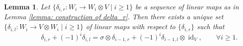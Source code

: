 \documentclass[a4paper,10pt]{amsart}
\newtheorem{lemma}[theorem]{Lemma}
\theoremstyle{definition}
\numberwithin{equation}{section}
\DeclareMathOperator{\Image}{Im} \DeclareMathOperator{\Ext}{Ext}
\DeclareMathOperator{\id}{id}
\begin{document}
\begin{lemma}\label{lemma: construction of delta_l}
Let $\{\delta_{i,r}:W_i\to W_i\otimes V\mid i\geq 1\}$ be a sequence of linear maps as in Lemma \ref{lemma: construction of delta_r}. Then there exists a unique set $\{\delta_{i,l}:W_i\to V\otimes W_i\mid i\geq 1\}$ of linear  maps with respect to $\{\delta_{i,r}\}$ such that
\begin{equation}\label{eq: relation between delta_l and delta_r}\qquad\quad
\delta_{i,r}+(-1)^i\delta_{i,l}=\sigma\otimes\delta_{i-1,r}+(-1)^i\delta_{i-1,l}\otimes \id_V,\qquad \forall i\geq 1.
\end{equation}


\end{lemma}
\end{document}
